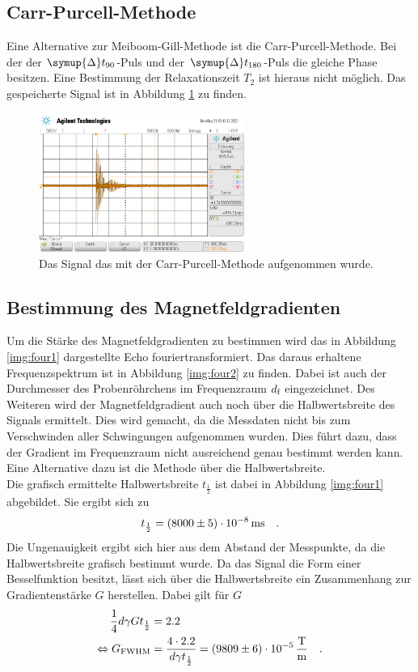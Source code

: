 \subsection{Carr-Purcell-Methode}


\noindent
Eine Alternative zur Meiboom-Gill-Methode ist die Carr-Purcell-Methode. Bei der der $\symup{\Delta} t_{90}$-Puls und der $\symup{\Delta} t_{180}$-Puls die gleiche Phase besitzen.
Eine Bestimmung der Relaxationszeit $T_2$ ist hieraus nicht möglich. Das gespeicherte Signal ist in Abbildung \ref{img:Sig2} zu finden.
\begin{figure}[H]
  \centering
  \includegraphics[width=0.6\textwidth]{python/data/scope_3.png}
  \caption{Das Signal das mit der Carr-Purcell-Methode aufgenommen wurde.}
\label{img:Sig2}
\end{figure}

\subsection{Bestimmung des Magnetfeldgradienten}


\noindent
Um die Stärke des Magnetfeldgradienten zu bestimmen wird das in Abbildung \ref{img:four1} dargestellte Echo fouriertransformiert. 
Das daraus erhaltene Frequenzspektrum ist in Abbildung \ref{img:four2} zu finden.
Dabei ist auch der Durchmesser des Probenröhrchens im Frequenzraum $d_\t{f}$ eingezeichnet.
Des Weiteren wird der Magnetfeldgradient auch noch über die Halbwertsbreite des Signals ermittelt. 
Dies wird gemacht, da die Messdaten nicht bis zum Verschwinden aller Schwingungen aufgenommen wurden.
Dies führt dazu, dass der Gradient im Frequenzraum nicht ausreichend genau bestimmt werden kann. Eine Alternative dazu ist die Methode über die Halbwertsbreite.\\
Die grafisch ermittelte Halbwertsbreite $t_\frac{1}{2}$ ist dabei in Abbildung \ref{img:four1} abgebildet.
Sie ergibt sich zu 
\begin{equation*}
  t_\frac{1}{2} = \SI{8000 (5)e-8}{\milli\second} \quad.
\end{equation*}
Die Ungenauigkeit ergibt sich hier aus dem Abstand der Messpunkte, da die Halbwertsbreite grafisch bestimmt wurde.
Da das Signal die Form einer Besselfunktion besitzt, lässt sich über die Halbwertsbreite ein Zusammenhang zur Gradientenstärke $G$ herstellen.
Dabei gilt für $G$ 
\begin{align*}
  \frac{1}{4} d \gamma G t_\frac{1}{2} &= 2.2 \\
  \Leftrightarrow G_\t{FWHM} &= \frac{4 \cdot 2.2}{d \gamma t_\frac{1}{2}} = \SI{9809(6)e-5}{\tesla\per\metre} \quad.
\end{align*}

